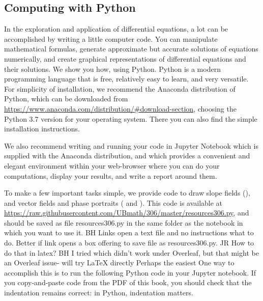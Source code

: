 \documentclass[12pt]{book}
\begin{document}

\subsection {Computing with Python}

In the exploration and application of differential equations, a lot can be accomplished by writing a little computer code.
You can manipulate mathematical formulas, 
generate approximate but accurate solutions of equations numerically, and 
create graphical representations of differential equations and their solutions.
We show you how, using Python. Python is a modern programming language that is free, relatively easy to learn,
and very versatile. For simplicity of installation, we recommend the Anaconda distribution of Python, 
which can be downloaded from 
\href{https://www.anaconda.com/distribution/\#download-section}{https://www.anaconda.com/distribution/\#download-section}, 
choosing the Python 3.7 version for your operating system.
There you can also find the simple installation instructions. 

We also recommend writing and
running your code in Jupyter Notebook which is supplied with the Anaconda distribution, and which 
provides a convenient and elegant environment within your web-browser 
where you can do your computations, display your results, and write a report around them.

To make a few important tasks simple, we provide code to draw slope fields (), and
vector fields and phase portraits ( and ). 
This code is available at 
\newline
\href{https://raw.githubusercontent.com/UBmath/306/master/resources306.py}{https://raw.githubusercontent.com/UBmath/306/master/resources306.py}, 
and should be saved 
{\color{blue} as file resources306.py }
in the same folder as the notebook in which you want to use it.
{\color{teal}BH Links open a text file and no instructions what to do.
Better if link opens a box offering to save file as resources306.py. JR How to do that in latex?
BH I tried  which
didn't work under Overleaf, but that might be
an Overleaf issue- will try LaTeX directly}
{\color{red}Perhaps the easiest}
{\color{blue}One} way to accomplish this is to run the following Python code in your Jupyter notebook.
If you copy-and-paste code from the PDF of this book, you should check that the indentation remains correct: 
in Python, indentation matters.
\end{document}
